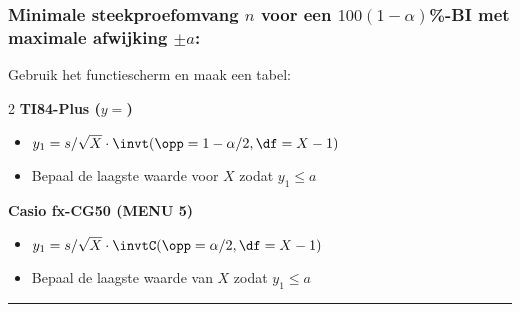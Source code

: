     \subsubsection*{Minimale steekproefomvang $n$ voor een $100(1-\alpha)$\si{\percent}-BI met maximale afwijking $\pm a$:}
        Gebruik het functiescherm en maak een tabel:
        \begin{multicols}{2}
            \centering\textbf{TI84-Plus ($y=$)}
                \begin{itemize}
                    \item $y_1 = s / \sqrt{X} \cdot \invt(\opp=1-\alpha/2, \df=X-1)$
                    \item Bepaal de laagste waarde voor $X$ zodat $y_1 \leq a$
                \end{itemize}

                \columnbreak

                \centering\textbf{Casio fx-CG50 (MENU 5)}
                \begin{itemize}
                    \item $y_1 = s / \sqrt{X} \cdot \invtC(\opp=\alpha/2, \df=X-1)$
                    \item Bepaal de laagste waarde van $X$ zodat $y_1 \leq a$
                \end{itemize}
        \end{multicols}
\hrule 

